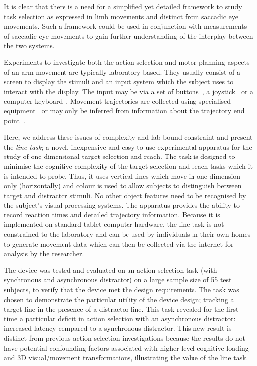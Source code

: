 \documentclass[10pt,letterpaper]{article}
\begin{document}
It is clear that there is a need for a simplified yet detailed
framework to study task selection as expressed in limb movements and
distinct from saccadic eye movements. Such a framework could be used
in conjunction with measurements of saccadic eye movements to gain
further understanding of the interplay between the two systems.

Experiments to investigate both the action selection and motor
planning aspects of an arm movement are typically laboratory
based. They usually consist of a screen to display the stimuli and an
input system which the subject uses to interact with the display. The
input may be via a set of
buttons~\cite{tipper_selective_1992,waszak_intention-based_2005}, a
joystick~\cite{pratt_action-centered_1994} or a computer
keyboard~\cite{elsner_effect_2001}. Movement trajectories are
collected using specialised
equipment~\cite{song_target_2008,jax_hand_2007} or may only be
inferred from information about the trajectory end
point~\cite{pratt_action-centered_1994}.

Here, we address these issues of complexity and lab-bound constraint
and present the \emph{line task}; a novel, inexpensive and easy to use
experimental apparatus for the study of one dimensional target
selection and reach. The task is designed to minimise the cognitive
complexity of the target selection and reach-tasks which it is
intended to probe. Thus, it uses vertical lines which move in one
dimension only (horizontally) and colour is used to allow subjects to
distinguish between target and distractor stimuli. No other object
features need to be recognised by the subject's visual processing
systems. The apparatus provides the ability to record reaction times
and detailed trajectory information. Because it is implemented on
standard tablet computer hardware, the line task is not constrained to
the laboratory and can be used by individuals in their own homes to
generate movement data which can then be collected via the internet
for analysis by the researcher.

The device was tested and evaluated on an action selection task (with
synchronous and asynchronous distractor) on a large sample size of 55
test subjects, to verify that the device met the design
requirements. The task was chosen to demonstrate the particular
utility of the device design; tracking a target line in the presence
of a distractor line. This task revealed for the first time a
particular deficit in action selection with an asynchronous
distractor: increased latency compared to a synchronous
distractor. This new result is distinct from previous action selection
investigations because the results do not have potential confounding
factors associated with higher level cognitive loading and 3D
visual/movement transformations, illustrating the value of the line
task.
\end{document}
